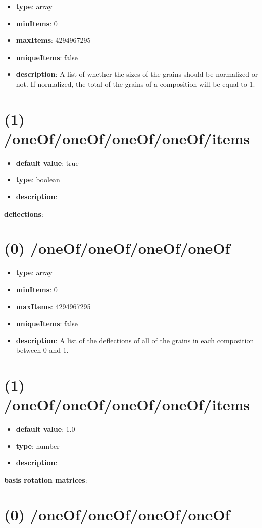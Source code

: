 \begin{itemize}[leftmargin=0em]\item {\bf type}: array
\item {\bf minItems}: 0
\item {\bf maxItems}: 4294967295
\item {\bf uniqueItems}: false
\item {\bf description}: A list of whether the sizes of the grains should be normalized or not. If normalized, the total of the grains of a composition will be equal to 1.
\end{itemize}\section{(1) /oneOf/oneOf/oneOf/oneOf/items}
\begin{itemize}[leftmargin=1em]\item {\bf default value}: true
\item {\bf type}: boolean
\item {\bf description}: 
\end{itemize}\item {\bf deflections}: \section{(0) /oneOf/oneOf/oneOf/oneOf}
\begin{itemize}[leftmargin=0em]\item {\bf type}: array
\item {\bf minItems}: 0
\item {\bf maxItems}: 4294967295
\item {\bf uniqueItems}: false
\item {\bf description}: A list of the deflections of all of the grains in each composition between 0 and 1.
\end{itemize}\section{(1) /oneOf/oneOf/oneOf/oneOf/items}
\begin{itemize}[leftmargin=1em]\item {\bf default value}: 1.0
\item {\bf type}: number
\item {\bf description}: 
\end{itemize}\item {\bf basis rotation matrices}: \section{(0) /oneOf/oneOf/oneOf/oneOf}

